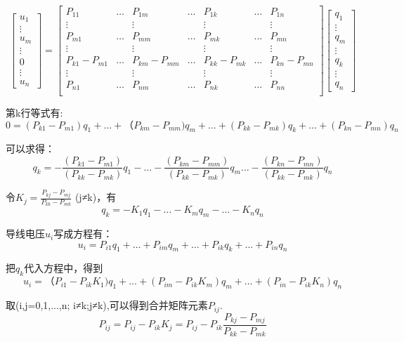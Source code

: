 \documentclass[11pt]{article}
\begin{document}
\begin{equation*} 
 \begin{bmatrix}
  u_1\\
  \vdots\\
  u_m\\
  \vdots\\
  0\\
  \vdots\\
  u_n
  \end{bmatrix} =
  \begin{bmatrix}
  P_{11}&\dots& P_{1m}&\dots&P_{1k}&\dots&P_{1n}\\
  \vdots& &\vdots& &\vdots& &\vdots\\
  P_{m1}&\dots& P_{mm}&\dots&P_{mk}&\dots&P_{mn}\\
   \vdots& &\vdots& &\vdots& &\vdots\\
    P_{k1}- P_{m1}&\dots& P_{km}-P_{mm}&\dots&P_{kk}-P_{mk}&\dots&P_{kn}-P_{mn}\\
   \vdots& &\vdots& &\vdots& &\vdots\\ 
    P_{n1}&\dots& P_{nm}&\dots&P_{nk}&\dots&P_{nn}\\
   \end{bmatrix}
   \begin{bmatrix}
   q_1\\
   \vdots\\
  q_m\\
  \vdots\\
  q_k\\
  \vdots\\
  q_n
 \end{bmatrix}
\end{equation*}

第k行等式有:
\[ 0= (P_{k1}- P_{m1})q_1+\dots+（P_{km}-P_{mm})q_m+\dots+(P_{kk}-P_{mk})q_k+\dots+(P_{kn}-P_{mn})q_n\]

可以求得：
\[q_k=-\frac{(P_{k1}- P_{m1})}{(P_{kk}-P_{mk})}q_1-\dots-\frac{(P_{km}- P_{mm})}{(P_{kk}-P_{mk})}q_m\dots-\frac{(P_{kn}- P_{mn})}{(P_{kk}-P_{mk})}q_n\]

令\(K_j=\frac{P_{kj}- P_{mj}}{P_{kk}-P_{mk}}\) (j≠k)，有
\[q_k=-K_1q_1-\dots-K_m q_m-\dots-K_n q_n\]

导线电压\(u_i\)写成方程有：
\[u_i=P_{i1}q_1+\dots+P_{im}q_m+\dots+P_{ik}q_k+\dots+P_{in}q_n\]

把\(q_k\)代入方程中，得到
\[u_i=（P_{i1}-P_{ik}K_1)q_1+\dots+(P_{im}-P_{ik}K_m)q_m+\dots+(P_{in}-P_{ik}K_n)q_n\]

取(i,j=0,1,...,n; i≠k;j≠k),可以得到合并矩阵元素\(P_{ij}\).
\[P_{ij}=P_{ij}-P_{ik}K_j=P_{ij}-P_{ik}\frac{P_{kj}- P_{mj}}{P_{kk}-P_{mk}}\]
\end{document}
